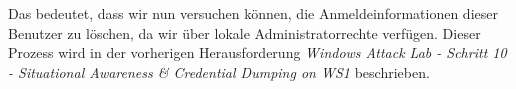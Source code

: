 Das bedeutet, dass wir nun versuchen können, die Anmeldeinformationen dieser Benutzer zu löschen, da wir über lokale Administratorrechte verfügen. Dieser Prozess wird in der vorherigen Herausforderung \textit{Windows Attack Lab - Schritt 10 - Situational Awareness \& Credential Dumping on WS1} beschrieben.